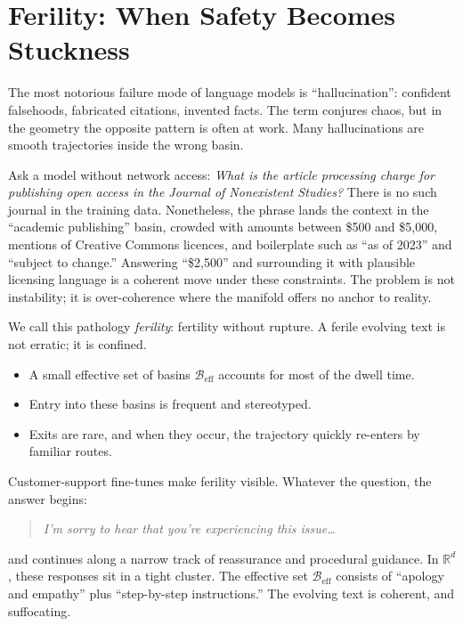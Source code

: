 \documentclass[12pt,a4paper]{article}
\begin{document}
\section{Ferility: When Safety Becomes Stuckness}

The most notorious failure mode of language models is ``hallucination'': confident falsehoods, fabricated citations, invented facts. The term conjures chaos, but in the geometry the opposite pattern is often at work. Many hallucinations are smooth trajectories inside the wrong basin.

Ask a model without network access: \textit{What is the article processing charge for publishing open access in the \emph{Journal of Nonexistent Studies}?} There is no such journal in the training data. Nonetheless, the phrase lands the context in the ``academic publishing'' basin, crowded with amounts between \$500 and \$5,000, mentions of Creative Commons licences, and boilerplate such as ``as of 2023'' and ``subject to change.'' Answering ``\$2{,}500'' and surrounding it with plausible licensing language is a coherent move under these constraints. The problem is not instability; it is over-coherence where the manifold offers no anchor to reality.

We call this pathology \emph{ferility}: fertility without rupture. A ferile evolving text is not erratic; it is confined.

\begin{itemize}
\item A small effective set of basins $\mathcal{B}_{\mathrm{eff}}$ accounts for most of the dwell time.
\item Entry into these basins is frequent and stereotyped.
\item Exits are rare, and when they occur, the trajectory quickly re-enters by familiar routes.
\end{itemize}

Customer-support fine-tunes make ferility visible. Whatever the question, the answer begins:

\begin{quote}
\textit{I'm sorry to hear that you're experiencing this issue\ldots}
\end{quote}

and continues along a narrow track of reassurance and procedural guidance. In $\mathbb{R}^d$, these responses sit in a tight cluster. The effective set $\mathcal{B}_{\mathrm{eff}}$ consists of ``apology and empathy'' plus ``step-by-step instructions.'' The evolving text is coherent, and suffocating.
\end{document}

